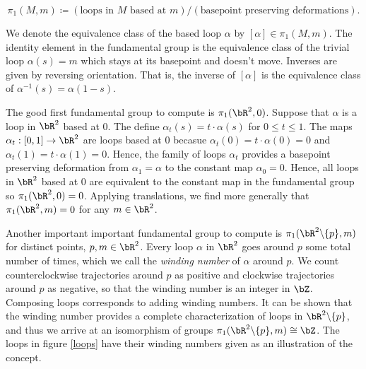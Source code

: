 $$\pi_1(M,m)\coloneqq \left(\text{loops in $M$ based at $m$}\right)/\left(\text{basepoint preserving deformations}\right).$$

We denote the equivalence class of the based loop $\alpha$ by $[\alpha]\in \pi_1(M,m)$. The identity element in the fundamental group is the equivalence class of the trivial loop $\alpha(s)=m$ which stays at its basepoint and doesn't move. Inverses are given by reversing orientation. That is, the inverse of $[\alpha]$ is the equivalence class of $\alpha^{-1}(s)=\alpha(1-s)$.

\begin{ex}
The good first fundamental group to compute is $\pi_1(\bR^2,0)$. Suppose that $\alpha$ is a loop in $\bR^2$ based at $0$. The define $\alpha_t(s)=t\cdot \alpha(s)$ for $0\leq t\leq 1$. The maps $\alpha_t:[0,1]\to \bR^2$ are loops based at $0$ becasue $\alpha_t(0)=t\cdot \alpha(0)=0$ and $\alpha_t(1)=t\cdot \alpha(1)=0$. Hence, the family of loops $\alpha_t$ provides a basepoint preserving deformation from $\alpha_1=\alpha$ to the constant map $\alpha_0=0$. Hence, all loops in $\bR^2$ based at $0$ are equivalent to the constant map in the fundamental group so $\pi_1(\bR^2,0)=0$. Applying translations, we find more generally that $\pi_1(\bR^2,m)=0$ for any $m\in \bR^2$.
\end{ex}

\begin{ex}
Another important important fundamental group to compute is $\pi_1(\bR^2\backslash\{p\},m)$ for distinct points, $p,m\in \bR^2$. Every loop $\alpha$ in $\bR^2$ goes around $p$ some total number of times, which we call the \textit{winding number} of $\alpha$ around $p$. We count counterclockwise trajectories around $p$ as positive and clockwise trajectories around $p$ as negative, so that the winding number is an integer in $\bZ$. Composing loops corresponds to adding winding numbers. It can be shown that the winding number provides a complete characterization of loops in $\bR^2\backslash \{p\}$, and thus we arrive at an isomorphism of groups $\pi_1(\bR^2\backslash\{p\},m)\cong \bZ$. The loops in figure \ref{loops} have their winding numbers given as an illustration of the concept.
\end{ex}

